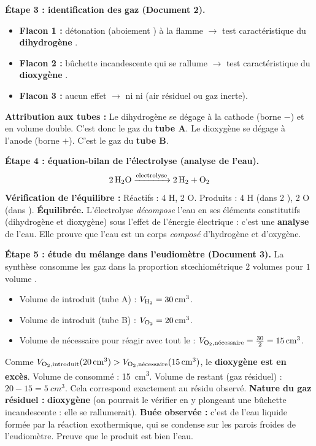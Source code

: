 \documentclass[11pt]{article}
\begin{document}
\begin{exoresolu}
\textbf{Étape 3 : identification des gaz (Document 2).}
\begin{itemize}
\item \textbf{Flacon 1 :} détonation (\og aboiement \fg) à la flamme $\rightarrow$ test caractéristique du \textbf{dihydrogène }.
\item \textbf{Flacon 2 :} bûchette incandescente qui se rallume $\rightarrow$ test caractéristique du \textbf{dioxygène }.
\item \textbf{Flacon 3 :} aucun effet $\rightarrow$ ni  ni  (air résiduel ou gaz inerte).
\end{itemize}
\textbf{Attribution aux tubes :} Le dihydrogène se dégage à la cathode (borne $-$) et en volume double. C'est donc le gaz du \textbf{tube A}. Le dioxygène se dégage à l'anode (borne $+$). C'est le gaz du \textbf{tube B}.

\textbf{Étape 4 : équation-bilan de l'électrolyse (analyse de l'eau).}
\[ \ce{2H2O ->[electrolyse] 2H2 + O2} \]
\textbf{Vérification de l'équilibre :} Réactifs : 4 H, 2 O. Produits : 4 H (dans 2 ), 2 O (dans ). \textbf{Équilibrée.}
L'électrolyse \emph{décompose} l'eau en ses éléments constitutifs (dihydrogène et dioxygène) sous l'effet de l'énergie électrique : c'est une \textbf{analyse} de l'eau. Elle prouve que l'eau est un corps \emph{composé} d'hydrogène et d'oxygène.

\textbf{Étape 5 : étude du mélange dans l'eudiomètre (Document 3).}
La synthèse consomme les gaz dans la proportion stœchiométrique $2$ volumes  pour $1$ volume .
\begin{itemize}
\item Volume de  introduit (tube A) : $V_{\ce{H2}} = \SI{30}{cm^3}$.
\item Volume de  introduit (tube B) : $V_{\ce{O2}} = \SI{20}{cm^3}$.
\item Volume de  nécessaire pour réagir avec tout le  : $V_{\ce{O2},\text{nécessaire}} = \frac{30}{2} = \SI{15}{cm^3}$.
\end{itemize}
Comme $V_{\ce{O2},\text{introduit}} (\SI{20}{cm^3}) > V_{\ce{O2},\text{nécessaire}} (\SI{15}{cm^3})$, le \textbf{dioxygène est en excès}.
Volume de  consommé : \SI{15}{cm^3}. Volume de  restant (gaz résiduel) : $20 - 15 = \SI{5}{cm^3}$. Cela correspond exactement au résidu observé.
\textbf{Nature du gaz résiduel :} \textbf{dioxygène } (on pourrait le vérifier en y plongeant une bûchette incandescente : elle se rallumerait).
\textbf{Buée observée :} c'est de l'eau liquide formée par la réaction exothermique, qui se condense sur les parois froides de l'eudiomètre. Preuve que le produit est bien l'eau.


\end{exoresolu}
\end{document}
